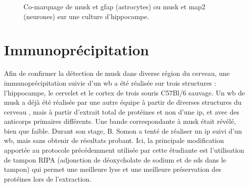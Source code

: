 \begin{figure}
\begin{subfigure}[h]{0.329\textwidth}
		\end{subfigure}
	\caption{Co-marquage de \gls{musk} et \gls{gfap} (astrocytes) ou \gls{musk} et \gls{map2} (neurones) sur une culture d'hippocampe.}
	\label{fig:MuSKMAP2GFAP}
	\end{figure}
	\FloatBarrier

\section{Immunoprécipitation}
\label{sec:IPresultat}
	Afin de confirmer la détection de \gls{musk} dans diverse région du cerveau, une immunoprécipitation suivie d'un \gls{wb} a été réalisée sur trois structures : l'hippocampe, le cervelet et le cortex de trois souris C57Bl/6 sauvage. Un \gls{wb} de \gls{musk} a déjà été réalisée par une autre équipe à partir de diverses structures du cerveau \cite{Garcia-Osta2006}, mais à partir d'extrait total de protéines et non d'une \gls{ip}, et avec des anticorps primaires différents. Une bande correspondante à \gls{musk} était révélé, bien que faible. Durant son stage, B. Somon a tenté de réaliser un \gls{ip} suivi d'un \gls{wb}, mais sans obtenir de résultats probant. Ici, la principale modification apportée au protocole précédemment utilisée par cette étudiante est l'utilisation de tampon RIPA (adjonction de déoxycholate de sodium et de \acrshort{sds} dans le tampon) qui permet une meilleure lyse et une meilleure préservation des protéines lors de l'extraction.
	
